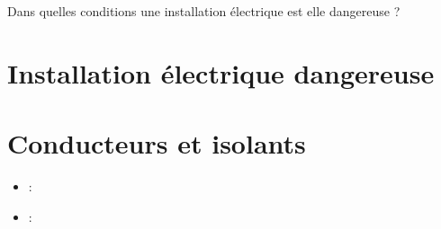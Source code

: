 \documentclass[12pt,a4paper]{article}
\date{}
\title{}
\begin{document}
	
\graphicspath{{./img/}}	



\begin{mypb}
	\begin{center}
		{\Large Dans quelles conditions une installation électrique est elle dangereuse ?}
	\end{center}
\end{mypb}


\section{Installation électrique dangereuse}










\section{Conducteurs et isolants}




\begin{myexos}
	\begin{itemize}
		\item {} : 
		\item {} :
		
	\end{itemize}
\end{myexos}
\appendix

\end{document}
